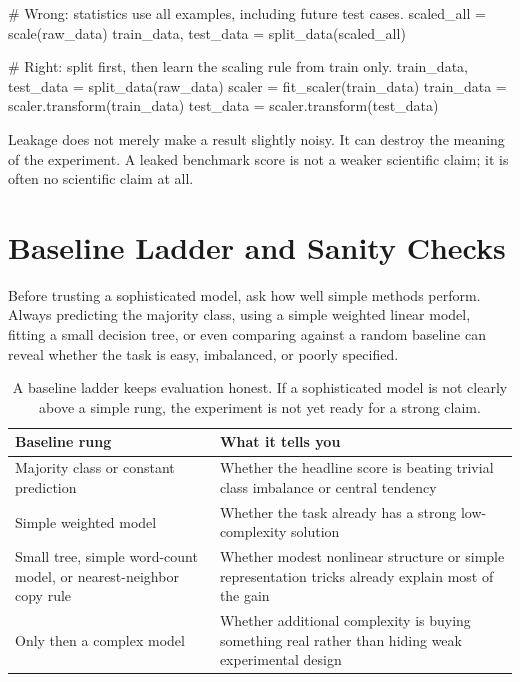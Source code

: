 \begin{codeexample}[caption={Leakage in one line of pseudocode}]
# Wrong: statistics use all examples, including future test cases.
scaled_all = scale(raw_data)
train_data, test_data = split_data(scaled_all)

# Right: split first, then learn the scaling rule from train only.
train_data, test_data = split_data(raw_data)
scaler = fit_scaler(train_data)
train_data = scaler.transform(train_data)
test_data = scaler.transform(test_data)
\end{codeexample}

\begin{warningbox}
Leakage does not merely make a result slightly noisy. It can destroy the meaning of the experiment. A leaked benchmark score is not a weaker scientific claim; it is often no scientific claim at all.
\end{warningbox}

\section{Baseline Ladder and Sanity Checks}

Before trusting a sophisticated model, ask how well simple methods perform. Always predicting the majority class, using a simple weighted linear model, fitting a small decision tree, or even comparing against a random baseline can reveal whether the task is easy, imbalanced, or poorly specified.

\begin{table}[t]
\centering
\small
\setlength{\tabcolsep}{4pt}
\begin{tabular}{p{2.46cm}p{7.78cm}}
\toprule
Baseline rung & What it tells you \\
\midrule
Majority class or constant prediction & Whether the headline score is beating trivial class imbalance or central tendency \\
Simple weighted model & Whether the task already has a strong low-complexity solution \\
Small tree, simple word-count model, or nearest-neighbor copy rule & Whether modest nonlinear structure or simple representation tricks already explain most of the gain \\
Only then a complex model & Whether additional complexity is buying something real rather than hiding weak experimental design \\
\bottomrule
\end{tabular}
\caption{A baseline ladder keeps evaluation honest. If a sophisticated model is not clearly above a simple rung, the experiment is not yet ready for a strong claim.}
\label{tab:baseline-ladder}
\end{table}

